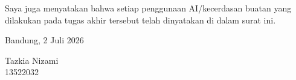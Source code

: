 \vspace{0.5em}

\noindent
Saya juga menyatakan bahwa setiap penggunaan AI/kecerdasan buatan yang dilakukan pada tugas akhir tersebut telah dinyatakan di dalam surat ini.

\vspace{0.9em}

\noindent\hfill
\begin{minipage}{4.5cm}
	\centering
	Bandung, 2 Juli 2026

	\vspace{1.5cm}
	Tazkia Nizami \\
	13522032
\end{minipage}
\clearpage
